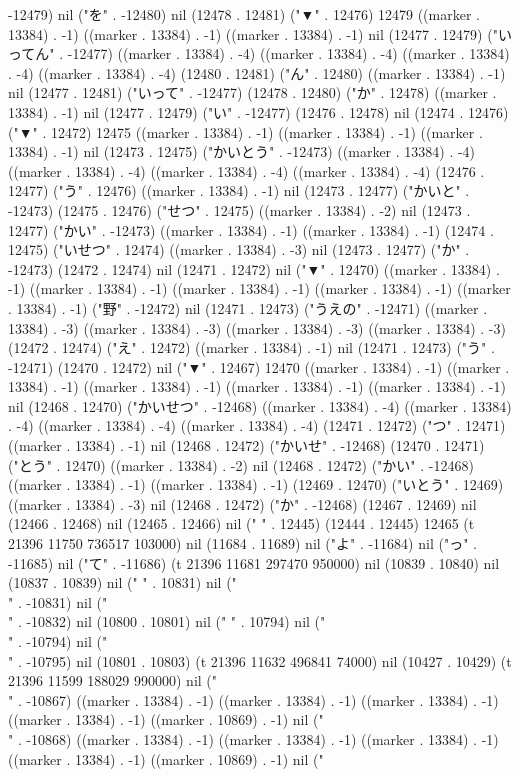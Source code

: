 -12479) nil ("を" . -12480) nil (12478 . 12481) ("▼" . 12476) 12479 ((marker . 13384) . -1) ((marker . 13384) . -1) ((marker . 13384) . -1) nil (12477 . 12479) ("いってん" . -12477) ((marker . 13384) . -4) ((marker . 13384) . -4) ((marker . 13384) . -4) ((marker . 13384) . -4) (12480 . 12481) ("ん" . 12480) ((marker . 13384) . -1) nil (12477 . 12481) ("いって" . -12477) (12478 . 12480) ("か" . 12478) ((marker . 13384) . -1) nil (12477 . 12479) ("い" . -12477) (12476 . 12478) nil (12474 . 12476) ("▼" . 12472) 12475 ((marker . 13384) . -1) ((marker . 13384) . -1) ((marker . 13384) . -1) nil (12473 . 12475) ("かいとう" . -12473) ((marker . 13384) . -4) ((marker . 13384) . -4) ((marker . 13384) . -4) ((marker . 13384) . -4) (12476 . 12477) ("う" . 12476) ((marker . 13384) . -1) nil (12473 . 12477) ("かいと" . -12473) (12475 . 12476) ("せつ" . 12475) ((marker . 13384) . -2) nil (12473 . 12477) ("かい" . -12473) ((marker . 13384) . -1) ((marker . 13384) . -1) (12474 . 12475) ("いせつ" . 12474) ((marker . 13384) . -3) nil (12473 . 12477) ("か" . -12473) (12472 . 12474) nil (12471 . 12472) nil ("▼" . 12470) ((marker . 13384) . -1) ((marker . 13384) . -1) ((marker . 13384) . -1) ((marker . 13384) . -1) ((marker . 13384) . -1) ("野" . -12472) nil (12471 . 12473) ("うえの" . -12471) ((marker . 13384) . -3) ((marker . 13384) . -3) ((marker . 13384) . -3) ((marker . 13384) . -3) (12472 . 12474) ("え" . 12472) ((marker . 13384) . -1) nil (12471 . 12473) ("う" . -12471) (12470 . 12472) nil ("▼" . 12467) 12470 ((marker . 13384) . -1) ((marker . 13384) . -1) ((marker . 13384) . -1) ((marker . 13384) . -1) ((marker . 13384) . -1) nil (12468 . 12470) ("かいせつ" . -12468) ((marker . 13384) . -4) ((marker . 13384) . -4) ((marker . 13384) . -4) ((marker . 13384) . -4) (12471 . 12472) ("つ" . 12471) ((marker . 13384) . -1) nil (12468 . 12472) ("かいせ" . -12468) (12470 . 12471) ("とう" . 12470) ((marker . 13384) . -2) nil (12468 . 12472) ("かい" . -12468) ((marker . 13384) . -1) ((marker . 13384) . -1) (12469 . 12470) ("いとう" . 12469) ((marker . 13384) . -3) nil (12468 . 12472) ("か" . -12468) (12467 . 12469) nil (12466 . 12468) nil (12465 . 12466) nil (" " . 12445) (12444 . 12445) 12465 (t 21396 11750 736517 103000) nil (11684 . 11689) nil ("よ" . -11684) nil ("っ" . -11685) nil ("て" . -11686) (t 21396 11681 297470 950000) nil (10839 . 10840) nil (10837 . 10839) nil ("
" . 10831) nil ("\\" . -10831) nil ("\\" . -10832) nil (10800 . 10801) nil ("
" . 10794) nil ("\\" . -10794) nil ("\\" . -10795) nil (10801 . 10803) (t 21396 11632 496841 74000) nil (10427 . 10429) (t 21396 11599 188029 990000) nil ("\\" . -10867) ((marker . 13384) . -1) ((marker . 13384) . -1) ((marker . 13384) . -1) ((marker . 13384) . -1) ((marker . 10869) . -1) nil ("\\" . -10868) ((marker . 13384) . -1) ((marker . 13384) . -1) ((marker . 13384) . -1) ((marker . 13384) . -1) ((marker . 10869) . -1) nil ("
